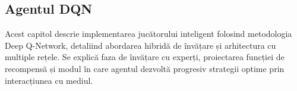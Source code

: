 \subsection{Agentul DQN}
Acest capitol descrie implementarea jucătorului inteligent folosind metodologia Deep Q-Network, detaliind abordarea hibridă de învățare și arhitectura cu multiple rețele. Se explică faza de învățare cu experți, proiectarea funcției de recompensă și modul în care agentul dezvoltă progresiv strategii optime prin interacțiunea cu mediul.